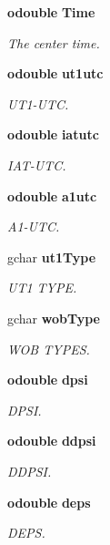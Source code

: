 \begin{CompactItemize}
{\bf odouble} {\bf Time}
\begin{CompactList}\small\item\em The center time. \item\end{CompactList}\item 
{\bf odouble} {\bf ut1utc}
\begin{CompactList}\small\item\em UT1-UTC. \item\end{CompactList}\item 
{\bf odouble} {\bf iatutc}
\begin{CompactList}\small\item\em IAT-UTC. \item\end{CompactList}\item 
{\bf odouble} {\bf a1utc}
\begin{CompactList}\small\item\em A1-UTC. \item\end{CompactList}\item 
gchar {\bf ut1Type}
\begin{CompactList}\small\item\em UT1 TYPE. \item\end{CompactList}\item 
gchar {\bf wob\-Type}
\begin{CompactList}\small\item\em WOB TYPES. \item\end{CompactList}\item 
{\bf odouble} {\bf dpsi}
\begin{CompactList}\small\item\em DPSI. \item\end{CompactList}\item 
{\bf odouble} {\bf ddpsi}
\begin{CompactList}\small\item\em DDPSI. \item\end{CompactList}\item 
{\bf odouble} {\bf deps}
\begin{CompactList}\small\item\em DEPS. \item\end{CompactList}\item 

\end{CompactItemize}
